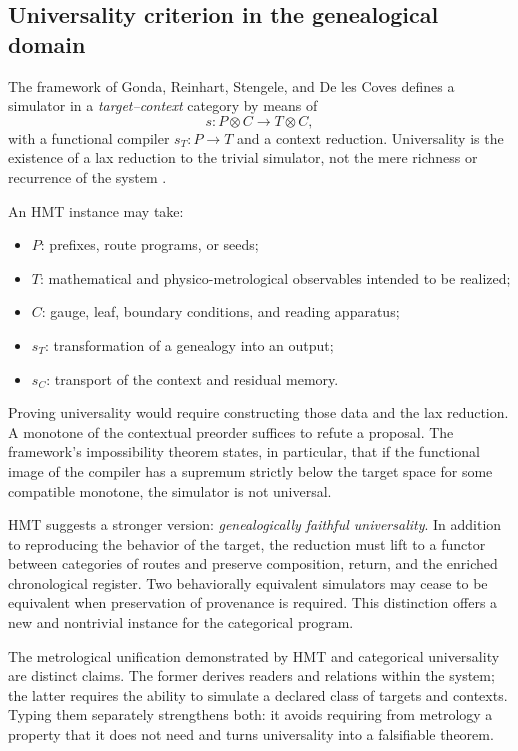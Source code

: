 \subsection{Universality criterion in the genealogical domain}

The framework of Gonda, Reinhart, Stengele, and De les Coves defines a simulator in
a \emph{target--context} category by means of
\[
 s:P\otimes C\longrightarrow T\otimes C,
 \tag{GMC-8.5}
\]
with a functional compiler $s_T:P\to T$ and a context reduction.
Universality is the existence of a lax reduction to the trivial simulator,
not the mere richness or recurrence of the system
\citep{gonda2024universality}.

An HMT instance may take:

\begin{itemize}
 \item $P$: prefixes, route programs, or seeds;
 \item $T$: mathematical and physico-metrological observables intended to be
realized;
 \item $C$: gauge, leaf, boundary conditions, and reading apparatus;
\item $s_T$: transformation of a genealogy into an output;
 \item $s_C$: transport of the context and residual memory.
\end{itemize}

Proving universality would require constructing those data and the lax reduction. A monotone of the contextual preorder suffices to refute a proposal. The framework's impossibility theorem states, in particular, that if the functional image of the compiler has a supremum strictly below the target space for some compatible monotone, the simulator is not universal.

\begin{bridgebox}
HMT suggests a stronger version: \emph{genealogically faithful universality}. In addition to reproducing the behavior of the target, the reduction must lift to a functor between categories of routes and preserve composition, return, and the enriched chronological register. Two behaviorally equivalent simulators may cease to be equivalent when preservation of provenance is required. This distinction offers a new and nontrivial instance for the categorical program.
\end{bridgebox}

The metrological unification demonstrated by HMT and categorical universality
are distinct claims. The former derives readers and relations within
the system; the latter requires the ability to simulate a declared class of targets and
contexts. Typing them separately strengthens both: it avoids requiring from metrology
a property that it does not need and turns universality into a falsifiable
theorem.

